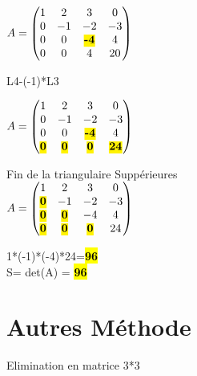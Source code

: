 \vspace{5mm} %

$
A =
\begin{pmatrix}
  1 & 2 & 3 & 0    \\
  0 & -1 & -2 & -3 \\
  0 & 0 & \hl{\textbf{-4}} & 4   \\
  0 & 0 & 4 & 20  \\
\end{pmatrix}
$

\vspace{5mm} %

L4-(-1)*L3\\

\vspace{5mm} %

$
A =
\begin{pmatrix}
  1 & 2 & 3 & 0    \\
  0 & -1 & -2 & -3 \\
  0 & 0 & \hl{\textbf{-4}} & 4   \\
  \hl{\textbf{0}} & \hl{\textbf{0}} & \hl{\textbf{0}} & \hl{\textbf{24}}  \\
\end{pmatrix}
$

Fin de la triangulaire Suppérieures \\

$
A =
\begin{pmatrix}
  1 & 2 & 3 & 0    \\
  \hl{\textbf{0}} & -1 & -2 & -3 \\
  \hl{\textbf{0}} & \hl{\textbf{0}} & -4 & 4   \\
  \hl{\textbf{0}} & \hl{\textbf{0}} & \hl{\textbf{0}} & 24  \\
\end{pmatrix}
$

\vspace{5mm} %

1*(-1)*(-4)*24=\hl{\textbf{96}} \\
\vspace{4mm} %
S= det(A) = \hl{\textbf{96}} \\

\section{Autres Méthode}

Elimination en matrice 3*3 \\

